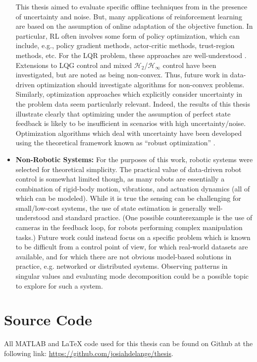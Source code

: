 \begin{itemize}
{This thesis aimed to evaluate specific offline techniques from \cite{de2019formulas} in the presence of uncertainty and noise.  But, many applications of reinforcement learning are based on the assumption of online adaptation of the objective function.  In particular, RL often involves some form of policy optimization, which can include, e.g., policy gradient methods, actor-critic methods, trust-region methods, etc.  For the LQR problem, these approaches are well-understood \cite{malik2019derivative}.  Extensions to LQG control \cite{zheng2022escaping, umenberger2022globally} and mixed $\mathcal{H}_{2}$/$\mathcal{H}_{\infty}$ control \cite{zhang2021derivative, zhang2020policy} have been investigated, but are noted as being non-convex.  Thus, future work in data-driven optimization should investigate algorithms for non-convex problems.  Similarly, optimization approaches which explicitly consider uncertainty in the problem data seem particularly relevant.  Indeed, the results of this thesis illustrate clearly that optimizing under the assumption of perfect state feedback is likely to be insufficient in scenarios with high uncertainty/noise.  Optimization algorithms which deal with uncertainty have been developed using the theoretical framework known as ``robust optimization'' \cite{soyster1973convex, ei1997robust, el1998robust, ben1999robust, ben2001lectures, ben2002robust, bertsimas2003robust, bertsimas2004price, chaerani2006modeling, joelianto5417249}.
}
%
\item{\textbf{Non-Robotic Systems:}
For the purposes of this work, robotic systems were selected for theoretical simplicity.  The practical value of data-driven robot control is somewhat limited though, as many robots are essentially a combination of rigid-body motion, vibrations, and actuation dynamics (all of which can be modeled).  While it is true the sensing can be challenging for small/low-cost systems, the use of state estimation is generally well-understood and standard practice.  (One possible counterexample is the use of cameras in the feedback loop, for robots performing complex manipulation tasks.)  Future work could instead focus on a specific problem which is known to be difficult from a control point of view, for which real-world datasets are available, and for which there are not obvious model-based solutions in practice, e.g. networked or distributed systems.  Observing patterns in singular values and evaluating mode decomposition could be a possible topic to explore for such a system.
}
\end{itemize}

\section{Source Code}
All MATLAB and LaTeX code used for this thesis can be found on Github at the following link: \url{https://github.com/josiahdelange/thesis}.
